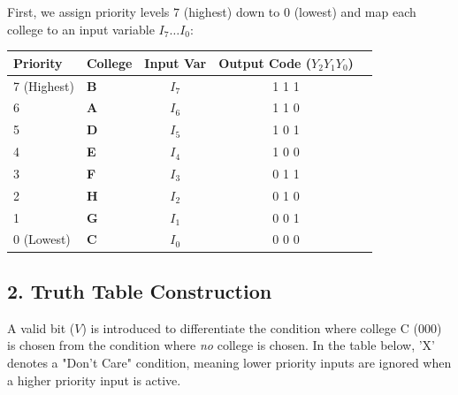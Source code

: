 \documentclass[12pt,a3paper]{article}
\begin{document}
\begin{enumerate}
\begin{tcolorbox}[enhanced,breakable,ansbox,colback=cD!4,colframe=cD,boxrule=0.8pt,arc=5pt,title={\textbf{Answer}},fonttitle=\bfseries\color{white},colbacktitle=cD]
First, we assign priority levels $7$ (highest) down to $0$ (lowest) and map each college to an input variable $I_7 \dots I_0$:

\begin{center}
\renewcommand{\arraystretch}{1.2}
\begin{tabular}{llccc}
\toprule
\textbf{Priority} & \textbf{College} & \textbf{Input Var} & \textbf{Output Code ($Y_2 Y_1 Y_0$)} \\
\midrule
7 (Highest) & \textbf{B} & $I_7$ & 1 1 1 \\
6 & \textbf{A} & $I_6$ & 1 1 0 \\
5 & \textbf{D} & $I_5$ & 1 0 1 \\
4 & \textbf{E} & $I_4$ & 1 0 0 \\
3 & \textbf{F} & $I_3$ & 0 1 1 \\
2 & \textbf{H} & $I_2$ & 0 1 0 \\
1 & \textbf{G} & $I_1$ & 0 0 1 \\
0 (Lowest)  & \textbf{C} & $I_0$ & 0 0 0 \\
\bottomrule
\end{tabular}
\end{center}

\subsection*{2. Truth Table Construction}

A valid bit ($V$) is introduced to differentiate the condition where college C ($000$) is chosen from the condition where \textit{no} college is chosen. In the table below, 'X' denotes a "Don't Care" condition, meaning lower priority inputs are ignored when a higher priority input is active.


\end{tcolorbox}
\end{enumerate}
\end{document}
